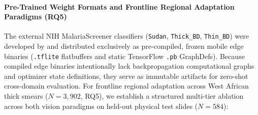 \documentclass[a4paper,11pt]{article}
\begin{document}
\paragraph{Pre-Trained Weight Formats and Frontline Regional Adaptation Paradigms (RQ5)}
The external NIH MalariaScreener classifiers (\texttt{Sudan}, \texttt{Thick\_BD}, \texttt{Thin\_BD}) were developed by \citet{delahunt2019} and distributed exclusively as pre-compiled, frozen mobile edge binaries (\texttt{.tflite} flatbuffers and static TensorFlow \texttt{.pb} GraphDefs). Because compiled edge binaries intentionally lack backpropagation computational graphs and optimizer state definitions, they serve as immutable artifacts for zero-shot cross-domain evaluation. For frontline regional adaptation across West African thick smears ($N = 3,902$, RQ5), we establish a structured multi-tier ablation across both vision paradigms on held-out physical test slides ($N = 584$):
\end{document}

